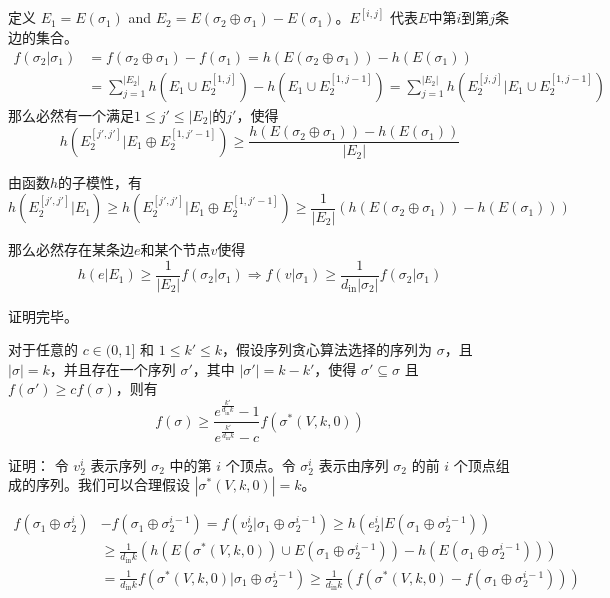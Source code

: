 定义 $E_1=E(\sigma_1)$ and $E_2=E(\sigma_2 \oplus \sigma_1)-E(\sigma_1)$。$E^{[i,j]}$ 代表$E$中第$i$到第$j$条边的集合。
\begin{align}
    f(\sigma_2|\sigma_1) & = f(\sigma_2 \oplus \sigma_1) - f(\sigma_1) = h(E(\sigma_2 \oplus \sigma_1)) - h(E(\sigma_1)) \\
    & = \sum^{|E_2|}_{j=1} h(E_1 \cup E_2^{[1,j]}) - h(E_1 \cup E_2^{[1,j-1]}) = \sum_{j=1}^{|E_2|} h(E_2^{[j,j]} | E_1 \cup E_2^{[1,j-1]})
\end{align}
那么必然有一个满足$1\le j' \le |E_2|$的$j'$，使得
\begin{equation}
    h(E_2^{[j',j']} | E_1 \oplus E_2^{[1,j'-1]}) \ge \frac{h(E(\sigma_2 \oplus \sigma_1)) - h(E(\sigma_1))}{|E_2|}   
\end{equation}

由函数$h$的子模性，有
\begin{equation}
h(E_2^{[j',j']} | E_1) \ge h(E_2^{[j',j']} | E_1 \oplus E_2^{[1,j'-1]}) \ge \frac{1}{|E_2|}(h(E(\sigma_2 \oplus \sigma_1)) - h(E(\sigma_1)))
\end{equation}

那么必然存在某条边$e$和某个节点$v$使得
\begin{equation}
h(e|E_1) \ge \frac{1}{|E_2|}f(\sigma_2|\sigma_1) \Longrightarrow
f(v|\sigma_1) \ge \frac{1}{d_{\text{in}}|\sigma_2|}f(\sigma_2|\sigma_1)
\end{equation}

\noindent 证明完毕。

\begin{lemma}
\label{lem:lem2}
对于任意的 $c \in (0,1]$ 和 $1 \le k' \le k$，假设序列贪心算法选择的序列为 $\sigma$，且 $|\sigma| = k$，并且存在一个序列 $\sigma'$，其中 $|\sigma'| = k-k'$，使得 $\sigma' \subseteq \sigma$ 且 $f(\sigma') \ge c f(\sigma)$，则有
\begin{equation}
 f(\sigma) \ge \frac{e^{\frac{k'}{d_{\text{in}}k}}-1} {e^{\frac{k'}{d_{\text{in}}k}}-c} f(\sigma^*(V,k,0))
\end{equation}
\end{lemma}

\noindent 证明：
令 $v_2^i$ 表示序列 $\sigma_2$ 中的第 $i$ 个顶点。令 $\sigma_2^i$ 表示由序列 $\sigma_2$ 的前 $i$ 个顶点组成的序列。我们可以合理假设 $|\sigma^*(V,k,0)|=k$。

\begin{align}
f(\sigma_1 \oplus \sigma_2^i) &- f(\sigma_1 \oplus \sigma_2^{i-1}) = f(v_2^i|\sigma_1 \oplus \sigma_2^{i-1}) \ge h(e_2^i|E(\sigma_1 \oplus \sigma_2^{i-1})) \label{equ:lem2_line1}\\
& \ge \frac{1}{d_{\text{in}}k} (h(E(\sigma^*(V,k,0)) \cup E(\sigma_1 \oplus \sigma_2^{i-1})) -h(E(\sigma_1 \oplus \sigma_2^{i-1}))) \label{equ:lem2_line2}\\
& = \frac{1}{d_{\text{in}}k} f(\sigma^*(V,k,0)|\sigma_1 \oplus \sigma_2^{i-1}) \ge \frac{1}{d_{\text{in}}k} (f(\sigma^*(V,k,0) - f(\sigma_1 \oplus \sigma_2^{i-1}))) \label{equ:lem2_line3}
\end{align}


